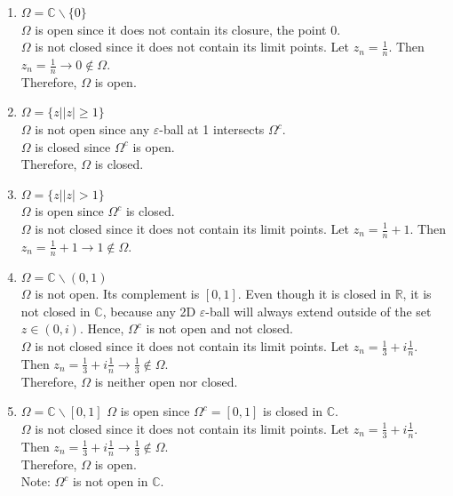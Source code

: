 \documentclass[11pt]{article}
\begin{document}
\begin{enumerate}
  \item $\Omega = \mathbb{C} \backslash \{0\}$ \\
  $\Omega$ is open since it does not contain its closure, the point 0. \\
  $\Omega$ is not closed since it does not contain its limit points. Let $z_n = \frac{1}{n}$. Then $z_n = \frac{1}{n} \to 0 \notin \Omega$. \\
  Therefore, $\Omega$ is open. 
  \item $\Omega = \{z||z| \geqslant 1\}$ \\
  $\Omega$ is not open since any $\varepsilon$-ball at 1 intersects $\Omega^c$. \\
  $\Omega$ is closed since $\Omega^c$ is open. \\
  Therefore, $\Omega$ is closed. 
  \item $\Omega = \{z||z| > 1\}$ \\
  $\Omega$ is open since $\Omega^c$ is closed. \\
  $\Omega$ is not closed since it does not contain its limit points. Let $z_n = \frac{1}{n} + 1$. Then $z_n = \frac{1}{n} + 1 \to 1 \notin \Omega$.
  \item $\Omega = \mathbb{C} \backslash (0, 1)$ \\ 
  $\Omega$ is not open. Its complement is $[0, 1]$. Even though it is closed in $\mathbb{R}$, it is not closed in $\mathbb{C}$, because any 2D $\varepsilon$-ball will always extend outside of the set $z \in (0, i)$. Hence, $\Omega^c$ is not open and not closed. \\
  $\Omega$ is not closed since it does not contain its limit points. Let $z_n = \frac{1}{3} + i\frac{1}{n}$. Then $z_n = \frac{1}{3} + i\frac{1}{n} \to \frac{1}{3} \notin \Omega$. \\
  Therefore, $\Omega$ is neither open nor closed. 
  \item $\Omega = \mathbb{C} \backslash [0, 1]$
  $\Omega$ is open since $\Omega^c = [0, 1]$ is closed in $\mathbb{C}$. \\ 
  $\Omega$ is not closed since it does not contain its limit points. Let $z_n = \frac{1}{3} + i\frac{1}{n}$. Then $z_n = \frac{1}{3} + i\frac{1}{n} \to \frac{1}{3} \notin \Omega$. \\
  Therefore, $\Omega$ is open. \\ 
  Note: $\Omega^c$ is not open in $\mathbb{C}$. 
\end{enumerate}
\end{document}
